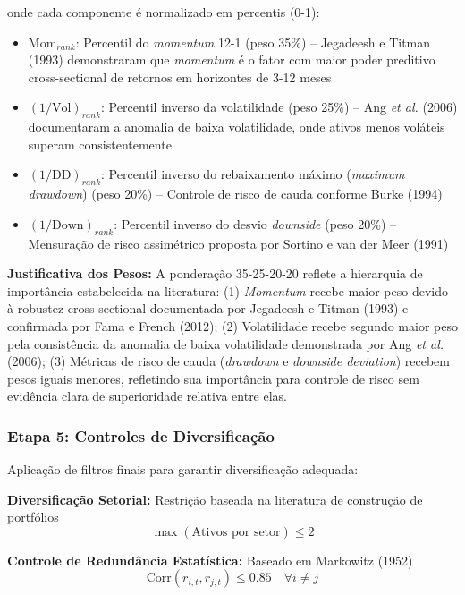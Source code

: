 onde cada componente é normalizado em percentis (0-1):
\begin{itemize}
    \item $\text{Mom}_{rank}$: Percentil do \textit{momentum} 12-1 (peso 35\%) -- Jegadeesh e Titman (1993) demonstraram que \textit{momentum} é o fator com maior poder preditivo cross-sectional de retornos em horizontes de 3-12 meses
    \item $(1/\text{Vol})_{rank}$: Percentil inverso da volatilidade (peso 25\%) -- Ang \textit{et al.} (2006) documentaram a anomalia de baixa volatilidade, onde ativos menos voláteis superam consistentemente
    \item $(1/\text{DD})_{rank}$: Percentil inverso do rebaixamento máximo (\textit{maximum drawdown}) (peso 20\%) -- Controle de risco de cauda conforme Burke (1994)
    \item $(1/\text{Down})_{rank}$: Percentil inverso do desvio \textit{downside} (peso 20\%) -- Mensuração de risco assimétrico proposta por Sortino e van der Meer (1991)
\end{itemize}

\textbf{Justificativa dos Pesos:} A ponderação 35-25-20-20 reflete a hierarquia de importância estabelecida na literatura: (1) \textit{Momentum} recebe maior peso devido à robustez cross-sectional documentada por Jegadeesh e Titman (1993) e confirmada por Fama e French (2012); (2) Volatilidade recebe segundo maior peso pela consistência da anomalia de baixa volatilidade demonstrada por Ang \textit{et al.} (2006); (3) Métricas de risco de cauda (\textit{drawdown} e \textit{downside deviation}) recebem pesos iguais menores, refletindo sua importância para controle de risco sem evidência clara de superioridade relativa entre elas.

\subsubsection{Etapa 5: Controles de Diversificação}

Aplicação de filtros finais para garantir diversificação adequada:

\textbf{Diversificação Setorial:} Restrição baseada na literatura de construção de portfólios
\begin{equation}
\max(\text{Ativos por setor}) \leq 2
\end{equation}

\textbf{Controle de Redundância Estatística:} Baseado em Markowitz (1952)
\begin{equation}
\text{Corr}(r_{i,t}, r_{j,t}) \leq 0.85 \quad \forall i \neq j
\end{equation}

